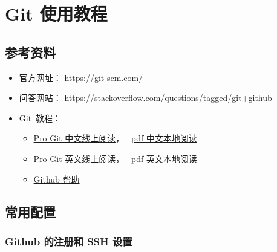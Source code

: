 \documentclass[
    11pt,
    base=hide,
    cite=authoryear,
    device=phone,
    lang=cn,
    mode=simple,
    result=answer,
    toc=onecol,
]{elegantbook_sierxue}
\begin{document}






\chapter{Git 使用教程}%
\label{cha:git-tips}

\section{参考资料}%
\label{sec:git-refs}

\begin{itemize}
    \item 官方网址： \href{https://git-scm.com/}{https://git-scm.com/}
    \item 问答网站：
        \href{https://stackoverflow.com/questions/tagged/git+github}
        {https://stackoverflow.com/questions/tagged/git+github}
    \item Git~教程：
        \begin{itemize}
            \item \href{https://git-scm.com/book/zh/v2}
                {Pro Git 中文线上阅读}，~%
                \href{books/progit_v2.1.31_zh.pdf}{pdf 中文本地阅读}
            \item \href{https://git-scm.com/book/en/v2}
                {Pro Git 英文线上阅读}，~%
                \href{books/progit_v2.1.177_en.pdf}{pdf 英文本地阅读}
            \item \href{https://help.github.com/en/github}{Github 帮助}
        \end{itemize}
\end{itemize}

\newpage
\section{常用配置}%
\label{sec:git-settings}

\subsection{Github 的注册和 SSH 设置}%
\label{sub:git-ssh}
\end{document}
